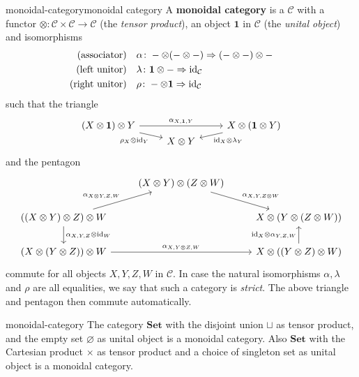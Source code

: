 \begin{topic}{monoidal-category}{monoidal category}
    A \textbf{monoidal category} is a  $\mathcal{C}$ with a functor $\otimes \colon \mathcal{C} \times \mathcal{C} \to \mathcal{C}$ (the \textit{tensor product}), an object $\textbf{1}$ in $\mathcal{C}$ (the \textit{unital object}) and  isomorphisms
    \[ \begin{aligned}
        \textup{(associator)} &\quad \alpha \colon - \otimes (- \otimes -) \Rightarrow (- \otimes -) \otimes - \qquad  \\
        \textup{(left unitor)} &\quad \lambda \colon \textbf{1} \otimes - \Rightarrow \textup{id}_{\mathcal{C}} \\
        \textup{(right unitor)} &\quad \rho \colon - \otimes \textbf{1} \Rightarrow \textup{id}_{\mathcal{C}}
    \end{aligned} \]
    such that the triangle
    \[ \svg \begin{tikzcd}[row sep=0em] (X \otimes \textbf{1}) \otimes Y \arrow{rr}{\alpha_{X,\textbf{1},Y}} \arrow[swap]{rd}{\rho_X \otimes \id_Y} & & X \otimes (\textbf{1} \otimes Y) \arrow{ld}{\id_X \otimes \lambda_Y} \\ & X \otimes Y & \end{tikzcd} \]
    and the pentagon
    \[ \svg \begin{tikzcd} & (X \otimes Y) \otimes (Z \otimes W) \arrow{rd}{\alpha_{X, Y, Z \otimes W}} & \\ ((X \otimes Y) \otimes Z) \otimes W \arrow{ur}{\alpha_{X \otimes Y, Z, W}} \arrow{d}{\alpha_{X,Y,Z} \otimes \id_W} & & X \otimes (Y \otimes (Z \otimes W)) \\ (X \otimes (Y \otimes Z)) \otimes W \arrow{rr}{\alpha_{X, Y \otimes Z, W}} & & X \otimes ((Y \otimes Z) \otimes W) \arrow{u}{\id_X \otimes \alpha_{Y, Z, W}} \end{tikzcd} \]
    commute for all objects $X, Y, Z, W$ in $\mathcal{C}$. In case the natural isomorphisms $\alpha, \lambda$ and $\rho$ are all equalities, we say that such a category is \textit{strict}. The above triangle and pentagon then commute automatically.
\end{topic}

\begin{example}{monoidal-category}
    The category $\textbf{Set}$ with the disjoint union $\sqcup$ as tensor product, and the empty set $\varnothing$ as unital object is a monoidal category. Also $\textbf{Set}$ with the Cartesian product $\times$ as tensor product and a choice of singleton set as unital object is a monoidal category.
\end{example}

